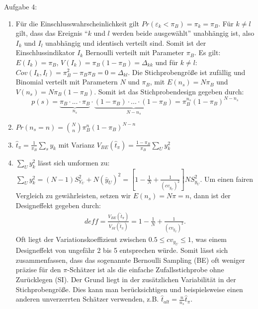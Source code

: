 \begin{Solution}{{Aufgabe 4:}}
\begin{enumerate}
	\item Für die Einschlusswahrscheinlichkeit gilt $Pr(\varepsilon_k<\pi_B) = \pi_k = \pi_B$. Für $k \neq l$ gilt, dass das Ereignis \enquote{$k$ und $l$ werden beide ausgewählt} unabhängig ist, also $I_k$ und $I_l$ unabhängig und identisch verteilt sind. Somit ist der Einschlussindikator $I_k$ Bernoulli verteilt mit Parameter $\pi_B$. Es gilt: $E(I_k)=\pi_B$, $V(I_k)=\pi_B(1-\pi_B) = \Delta_{kk}$ und für $k \neq l$: $Cov(I_k,I_l)=\pi_B^2-\pi_B\pi_B = 0 = \Delta_{kl}$. Die Stichprobengröße ist zufällig und Binomial verteilt mit Parametern $N$ und $\pi_B$, mit $E(n_s)=N\pi_B$ und $V(n_s)=N\pi_B(1-\pi_B)$. Somit ist das Stichprobendesign gegeben durch: $$p(s)=\underbrace{\pi_B \cdot ... \cdot \pi_B}_{n_s}\cdot \underbrace{(1-\pi_B) \cdot ... \cdot (1-\pi_B)}_{N-n_s} = \pi_B^{n_s}(1-\pi_B)^{N-n_s}$$
	\item $Pr(n_s = n) = \binom{N}{n}\pi_B^n(1-\pi_B)^{N-n}$
	\item $\hat{t}_\pi = \frac{1}{\pi_B}\sum_s y_k$ mit Varianz $V_{BE}(\hat{t}_\pi)= \frac{1-\pi_B}{\pi_B} \sum_U y_k^2$
	\item $\sum_U y_k^2$ lässt sich umformen zu: $\sum_U y_k^2 = (N-1)S_{Y_U}^2 + N(\bar{y}_U)^2 = \left[1-\frac{1}{N}+\frac{1}{(cv_{y_U})^2}\right]N S_{y_U}^2$. Um einen fairen Vergleich zu gewährleisten, setzen wir $E(n_s)=N\pi=n$, dann ist der Designeffekt gegeben durch:
	\begin{align*}
	deff = \frac{V_{BE}(\hat{t}_\pi)}{V_{SI}(\hat{t}_\pi)} = 1-\frac{1}{N}+\frac{1}{(cv_{y_U})^2}.
	\end{align*}
	Oft liegt der Variationskoeffizient zwischen $0.5 \leq cv_{y_U} \leq 1$, was einem Designeffekt von ungefähr 2 bis 5 entsprechen würde. Somit lässt sich zusammenfassen, dass das sogenannte Bernoulli Sampling (BE) oft weniger präzise für den $\pi$-Schätzer ist als die einfache Zufallsstichprobe ohne Zurücklegen (SI). Der Grund liegt in der zusätzlichen Variabilität in der Stichprobengröße. Dies kann man berücksichtigen und beispielsweise einen anderen unverzerrten Schätzer verwenden, z.B. $\hat{t}_{alt}=\frac{n}{n_s} \hat{t}_\pi$.
\end{enumerate}
\end{Solution}

